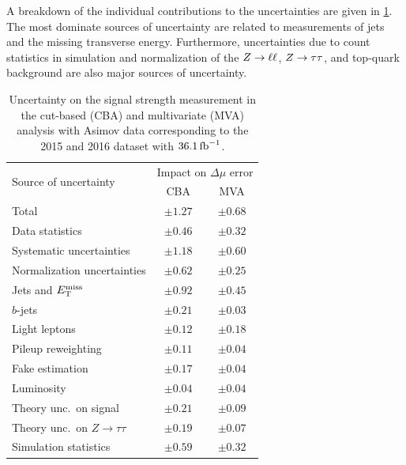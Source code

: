 A breakdown of the individual contributions to the uncertainties are given in \cref{tab:fit:result:uncert}.
The most dominate sources of uncertainty are related to measurements of jets and the missing transverse energy.
Furthermore, uncertainties due to count statistics in simulation and normalization of the $Z \to \ell \ell$, $Z \to \tau \tau$, and top-quark background
are also major sources of uncertainty.

\begin{table}[pb]
    \centering
    \caption{Uncertainty on the signal strength measurement in the cut-based (CBA) and multivariate (MVA) analysis
             with Asimov data corresponding to the 2015 and 2016 dataset with $\SI{36.1}{\invfb}$.}\label{tab:fit:result:uncert}
    \begin{tabular}{lcc}
        \toprule
         \multirow{2}{*}{Source of uncertainty} & \multicolumn{2}{c}{Impact on $\Delta \mu$ error}  \\
                                        & CBA        & MVA        \\ \midrule
         Total                          & $\pm 1.27$ & $\pm 0.68$ \\
         Data statistics                & $\pm 0.46$ & $\pm 0.32$ \\
         Systematic uncertainties       & $\pm 1.18$ & $\pm 0.60$ \\ \cmidrule{1-3}
         Normalization uncertainties    & $\pm 0.62$ & $\pm 0.25$ \\
         Jets and $E_\text{T}^\text{miss}$             & $\pm 0.92$ & $\pm 0.45$ \\
         $b$-jets                       & $\pm 0.21$ & $\pm 0.03$ \\
         Light leptons                  & $\pm 0.12$ & $\pm 0.18$ \\
         Pileup reweighting             & $\pm 0.11$ & $\pm 0.04$ \\
         Fake estimation                & $\pm 0.17$ & $\pm 0.04$ \\
         Luminosity                     & $\pm 0.04$ & $\pm 0.04$ \\
         Theory unc.\ on signal         & $\pm 0.21$ & $\pm 0.09$ \\
         Theory unc.\ on $Z\to\tau\tau$ & $\pm 0.19$ & $\pm 0.07$ \\
         Simulation statistics          & $\pm 0.59$ & $\pm 0.32$ \\
         \bottomrule
    \end{tabular}
\end{table}
